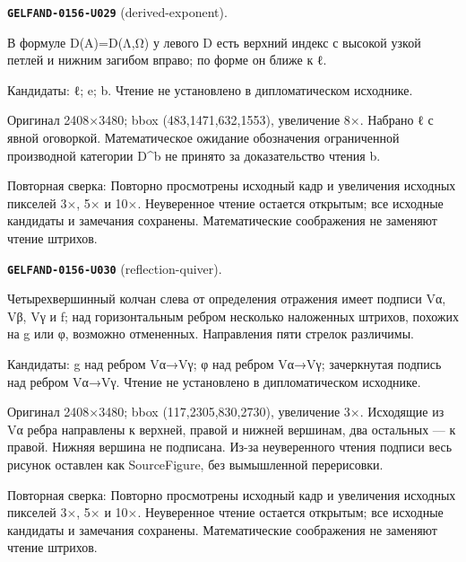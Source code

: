 \par\noindent\leavevmode{}\label{GELFAND-0156-U029}\label{GELFAND-P001444:derived-exponent}\textbf{\texttt{GELFAND-0156-U029}} (derived-exponent).\nopagebreak[4]\par
В формуле D(A)=D(Λ,Ω) у левого D есть верхний индекс с высокой узкой петлей и нижним загибом вправо; по форме он ближе к ℓ.\par
Кандидаты: ℓ; e; b. Чтение не установлено в дипломатическом исходнике.\par
Оригинал 2408×3480; bbox (483,1471,632,1553), увеличение 8×. Набрано ℓ с явной оговоркой. Математическое ожидание обозначения ограниченной производной категории D\textasciicircum{}b не принято за доказательство чтения b.\par
Повторная сверка: Повторно просмотрены исходный кадр и увеличения исходных пикселей 3×, 5× и 10×. Неуверенное чтение остается открытым; все исходные кандидаты и замечания сохранены. Математические соображения не заменяют чтение штрихов.\par\medskip
\par\noindent\leavevmode{}\label{GELFAND-0156-U030}\label{GELFAND-P001444:reflection-quiver}\textbf{\texttt{GELFAND-0156-U030}} (reflection-quiver).\nopagebreak[4]\par
Четырехвершинный колчан слева от определения отражения имеет подписи Vα, Vβ, Vγ и f; над горизонтальным ребром несколько наложенных штрихов, похожих на g или φ, возможно отмененных. Направления пяти стрелок различимы.\par
Кандидаты: g над ребром Vα→Vγ; φ над ребром Vα→Vγ; зачеркнутая подпись над ребром Vα→Vγ. Чтение не установлено в дипломатическом исходнике.\par
Оригинал 2408×3480; bbox (117,2305,830,2730), увеличение 3×. Исходящие из Vα ребра направлены к верхней, правой и нижней вершинам, два остальных — к правой. Нижняя вершина не подписана. Из-за неуверенного чтения подписи весь рисунок оставлен как SourceFigure, без вымышленной перерисовки.\par
Повторная сверка: Повторно просмотрены исходный кадр и увеличения исходных пикселей 3×, 5× и 10×. Неуверенное чтение остается открытым; все исходные кандидаты и замечания сохранены. Математические соображения не заменяют чтение штрихов.\par\medskip
